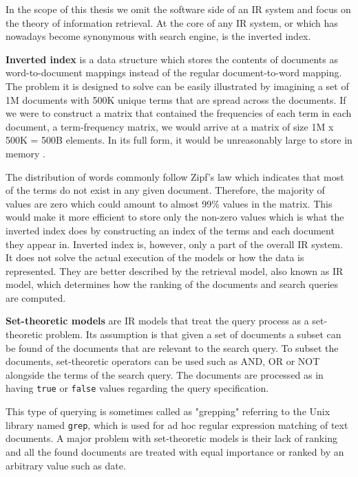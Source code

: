 In the scope of this thesis we omit the software side of an IR system and focus on the theory of information retrieval. At the core of any IR system, or which has nowadays become synonymous with search engine, is the inverted index.

\textbf{Inverted index} is a data structure which stores the contents of documents as word-to-document mappings instead of the regular document-to-word mapping. The problem it is designed to solve can be easily illustrated by imagining a set of 1M documents with 500K unique terms that are spread across the documents. If we were to construct a matrix that contained the frequencies of each term in each document, a term-frequency matrix, we would arrive at a matrix of size 1M x 500K = 500B elements. In its full form, it would be unreasonably large to store in memory \cite{intro-to-ir}.

The distribution of words commonly follow Zipf's law which indicates that most of the terms do not exist in any given document. Therefore, the majority of values are zero which could amount to almost 99\% values in the matrix. This would make it more efficient to store only the non-zero values which is what the inverted index does by constructing an index of the terms and each document they appear in. Inverted index is, however, only a part of the overall IR system. It does not solve the actual execution of the models or how the data is represented. They are better described by the retrieval model, also known as IR model, which determines how the ranking of the documents and search queries are computed.

\textbf{Set-theoretic models} are IR models that treat the query process as a set-theoretic problem. Its assumption is that given a set of documents a subset can be found of the documents that are relevant to the search query. To subset the documents, set-theoretic operators can be used such as AND, OR or NOT alongside the terms of the search query. The documents are processed as in having \texttt{true} or \texttt{false} values regarding the query specification.

This type of querying is sometimes called as "grepping" referring to the Unix library named \texttt{grep}, which is used for ad hoc regular expression matching of text documents. A major problem with set-theoretic models is their lack of ranking and all the found documents are treated with equal importance or ranked by an arbitrary value such as date.

